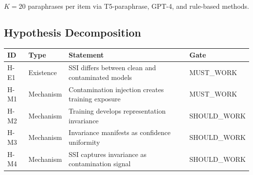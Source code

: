 $K=20$ paraphrases per item via T5-paraphrase, GPT-4, and rule-based methods.

\subsection{Hypothesis Decomposition}

\begin{table}[h]
\centering
\begin{tabular}{@{}llll@{}}
\toprule
ID & Type & Statement & Gate \\
\midrule
H-E1 & Existence & SSI differs between clean and contaminated models & MUST\_WORK \\
H-M1 & Mechanism & Contamination injection creates training exposure & MUST\_WORK \\
H-M2 & Mechanism & Training develops representation invariance & SHOULD\_WORK \\
H-M3 & Mechanism & Invariance manifests as confidence uniformity & SHOULD\_WORK \\
H-M4 & Mechanism & SSI captures invariance as contamination signal & SHOULD\_WORK \\
\bottomrule
\end{tabular}
\end{table}
